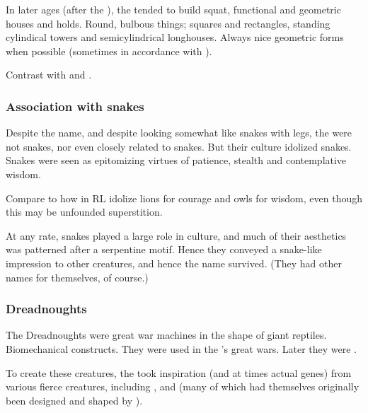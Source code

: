 In later ages (after the \firstbanewar), the \ophidians tended to build squat, functional and geometric houses and holds. 
Round, bulbous things; squares and rectangles, standing cylindical towers and semicylindrical longhouses. 
Always nice geometric forms when possible (sometimes in accordance with ). 

Contrast with  and . 





\subsubsection{Association with snakes}
Despite the name, and despite looking somewhat like snakes with legs, the \ophidians{} were not snakes, nor even closely related to snakes. 
But their culture idolized snakes. 
Snakes were seen as epitomizing virtues of patience, stealth and contemplative wisdom. 

Compare to how \humans{} in RL idolize lions for courage and owls for wisdom, even though this may be unfounded superstition. 

At any rate, snakes played a large role in \ophidian{} culture, and much of their aesthetics was patterned after a serpentine motif. 
Hence they conveyed a snake-like impression to other creatures, and hence the name \quo{\ophidian} survived. 
(They had other names for themselves, of course.)





\subsubsection{Dreadnoughts}
The Dreadnoughts were great war machines in the shape of giant reptiles.
Biomechanical constructs. 
They were used in the \caisiths's great wars.
Later they were . 

To create these creatures, the \ophidians{} took inspiration (and at times actual genes) from various fierce creatures, including \nycans, \corgoroth{} and \vreiiden{} (many of which had themselves originally been designed and shaped by \ophidians). 





